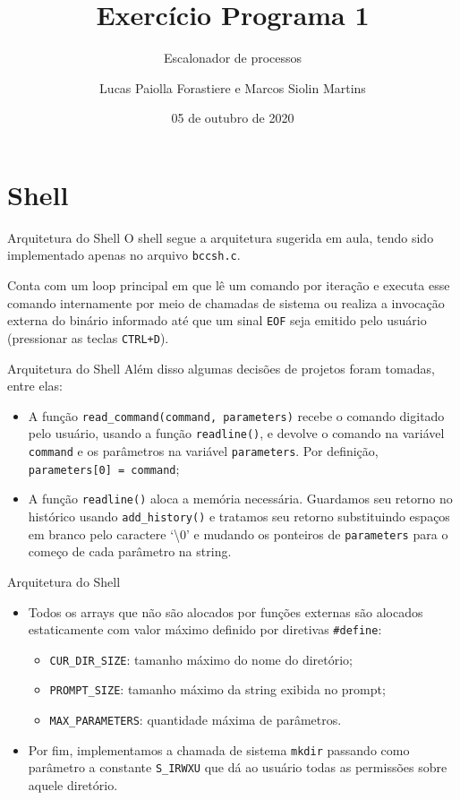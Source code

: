 \documentclass[10pt]{beamer}
\title{Exercício Programa 1}
\subtitle{Escalonador de processos}
\institute{IME-USP}
\author{Lucas Paiolla Forastiere e Marcos Siolin Martins}
\date{05 de outubro de 2020}
\begin{document}
    \maketitle
    \section{Shell}
    \begin{frame}{Arquitetura do Shell}
      O shell segue a arquitetura sugerida em aula, tendo sido implementado apenas no arquivo \texttt{bccsh.c}.

      Conta com um loop principal em que lê um comando por iteração e executa esse comando internamente por meio de chamadas de sistema ou realiza a invocação externa do binário informado até que um sinal \texttt{EOF} seja emitido pelo usuário (pressionar as teclas \texttt{CTRL+D}).
    \end{frame}
    \begin{frame}{Arquitetura do Shell}
      Além disso algumas decisões de projetos foram tomadas, entre elas:
      \begin{itemize}
        \justifying
        \item A função \texttt{read\_command(command, parameters)} recebe o comando digitado pelo usuário, usando a função \texttt{readline()}, e devolve o comando na variável \texttt{command} e os parâmetros na variável \texttt{parameters}. Por definição, \texttt{parameters[0] = command};
        \item A função \texttt{readline()} aloca a memória necessária. Guardamos seu retorno no histórico usando \texttt{add\_history()} e tratamos seu retorno substituindo espaços em branco pelo caractere `\textbackslash 0' e mudando os ponteiros de \texttt{parameters} para o começo de cada parâmetro na string.
      \end{itemize}
    \end{frame}
    \begin{frame}{Arquitetura do Shell}
      \begin{itemize}
        \justifying
        \item Todos os arrays que não são alocados por funções externas são alocados estaticamente com valor máximo definido por diretivas \texttt{\#define}:
        \begin{itemize}
          \item \texttt{CUR\_DIR\_SIZE}: tamanho máximo do nome do diretório;
          \item \texttt{PROMPT\_SIZE}: tamanho máximo da string exibida no prompt;
          \item \texttt{MAX\_PARAMETERS}: quantidade máxima de parâmetros.
        \end{itemize}
        \item Por fim, implementamos a chamada de sistema \texttt{mkdir} passando como parâmetro a constante \texttt{S\_IRWXU} que dá ao usuário todas as permissões sobre aquele diretório.
      \end{itemize}
    \end{frame}
\end{document}
